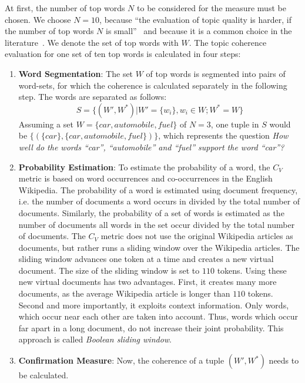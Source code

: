 \documentclass[
        a4paper,
        titlepage,
        twoside,
        parskip,
        numbers=noenddot
        ]{scrbook}
\theoremstyle{break}
\begin{document}
At first, the number of top words $N$ to be considered for the measure must be chosen.
We choose $N=10$, because ``the evaluation of topic quality is harder, if the number of top words $N$ is small''~\cite{Roder2015} and because it is a common choice in the literature~\cite{Aletras2013,Roder2015}.
We denote the set of top words with $W$.
The topic coherence evaluation for one set of ten top words is calculated in four steps:
\begin{enumerate}
  \item \textbf{Word Segmentation}:
    The set $W$ of top words is segmented into pairs of word-sets, for which the coherence is calculated separately in the following step.
    The words are separated as follows:
    \begin{equation*}
      S = \{ (W', W^*) | W' = \{w_i\}, w_i \in W; W^* = W \}
    \end{equation*}
    Assuming a set $W = \{ car, automobile, fuel \}$ of $N = 3$, one tuple in $S$ would be $\{ (\{car\}, \{car, automobile, fuel\})\}$, which represents the question \emph{How well do the words ``car'', ``automobile'' and ``fuel'' support the word ``car''?}
  \item \textbf{Probability Estimation}:
    To estimate the probability of a word, the $C_V$ metric is based on word occurrences and co-occurrences in the English Wikipedia.
    The probability of a word is estimated using document frequency, i.e. the number of documents a word occurs in divided by the total number of documents.
    Similarly, the probability of a set of words is estimated as the number of documents all words in the set occur divided by the total number of documents.
    The $C_V$ metric does not use the original Wikipedia articles as documents, but rather runs a sliding window over the Wikipedia articles.
    The sliding window advances one token at a time and creates a new virtual document.
    The size of the sliding window is set to $110$ tokens.
    Using these new virtual documents has two advantages.
    First, it creates many more documents, as the average Wikipedia article is longer than $110$ tokens.
    Second and more importantly, it exploits context information.
    Only words, which occur near each other are taken into account.
    Thus, words which occur far apart in a long document, do not increase their joint probability.
    This approach is called \emph{Boolean sliding window}.
  \item \textbf{Confirmation Measure}:
    Now, the coherence of a tuple $(W', W^*)$ needs to be calculated.

\end{enumerate}
\end{document}
